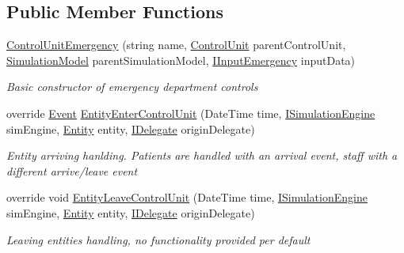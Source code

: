 \subsection*{Public Member Functions}
\begin{DoxyCompactItemize}
\item 
\hyperlink{class_general_health_care_elements_1_1_department_models_1_1_emergency_1_1_control_unit_emergency_a60c29c15ef178c0cbd497a61b2f5d65a}{Control\+Unit\+Emergency} (string name, \hyperlink{class_simulation_core_1_1_h_c_c_m_elements_1_1_control_unit}{Control\+Unit} parent\+Control\+Unit, \hyperlink{class_simulation_core_1_1_simulation_classes_1_1_simulation_model}{Simulation\+Model} parent\+Simulation\+Model, \hyperlink{interface_general_health_care_elements_1_1_department_models_1_1_emergency_1_1_i_input_emergency}{I\+Input\+Emergency} input\+Data)
\begin{DoxyCompactList}\small\item\em Basic constructor of emergency department controls \end{DoxyCompactList}\item 
override \hyperlink{class_simulation_core_1_1_h_c_c_m_elements_1_1_event}{Event} \hyperlink{class_general_health_care_elements_1_1_department_models_1_1_emergency_1_1_control_unit_emergency_aabd8927552439d4ded7081928bbeb60e}{Entity\+Enter\+Control\+Unit} (Date\+Time time, \hyperlink{interface_simulation_core_1_1_simulation_classes_1_1_i_simulation_engine}{I\+Simulation\+Engine} sim\+Engine, \hyperlink{class_simulation_core_1_1_h_c_c_m_elements_1_1_entity}{Entity} entity, \hyperlink{interface_simulation_core_1_1_h_c_c_m_elements_1_1_i_delegate}{I\+Delegate} origin\+Delegate)
\begin{DoxyCompactList}\small\item\em Entity arriving hanlding. Patients are handled with an arrival event, staff with a different arrive/leave event \end{DoxyCompactList}\item 
override void \hyperlink{class_general_health_care_elements_1_1_department_models_1_1_emergency_1_1_control_unit_emergency_aa60745df78607f4a5265a5ffcf168b47}{Entity\+Leave\+Control\+Unit} (Date\+Time time, \hyperlink{interface_simulation_core_1_1_simulation_classes_1_1_i_simulation_engine}{I\+Simulation\+Engine} sim\+Engine, \hyperlink{class_simulation_core_1_1_h_c_c_m_elements_1_1_entity}{Entity} entity, \hyperlink{interface_simulation_core_1_1_h_c_c_m_elements_1_1_i_delegate}{I\+Delegate} origin\+Delegate)
\begin{DoxyCompactList}\small\item\em Leaving entities handling, no functionality provided per default \end{DoxyCompactList}\end{DoxyCompactItemize}
